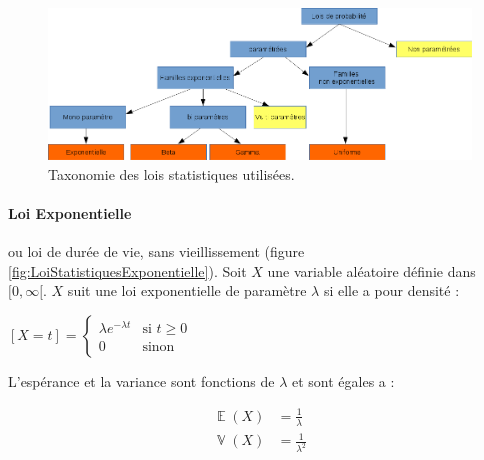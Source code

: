 \documentclass[a4paper,12pt]{report}
\DeclareMathOperator{\E}{\mathbb{E}} %
\DeclareMathOperator{\V}{\mathbb{V}} %
\theoremstyle{plain}				%
\theoremstyle{definition}				%
\begin{document}
\begin{figure}
{\centering
\includegraphics[width=\columnwidth]{taxonomieLoisStatistiques.png}
\caption{Taxonomie des lois statistiques utilisées.}
\label{fig:taxonomieLoisStatistiques}
\par}
\end{figure}

\paragraph{Loi Exponentielle} 
ou loi de durée de vie, sans vieillissement (figure \ref{fig:LoiStatistiquesExponentielle}).
Soit $X$ une variable aléatoire définie dans $[0, \infty[$. $X$ suit une loi exponentielle de paramètre $\lambda$ si elle a pour densité :


  \begin{center}
  $[X=t] = \left\{
    \begin{array}{ll}
        \lambda e^{-\lambda t}  & \mbox{si } t \geq 0  \\
        0 & \mbox{sinon}
    \end{array}
	\right.$
  \label{definitionLoiExponentielleDensite}
  \end{center}

L’espérance et la variance sont fonctions de $\lambda$ et sont égales a :

\begin{align*}
	\E(X) &= \frac{1}{\lambda} \\
	\V(X) &= \frac{1}{\lambda ^2}
\end{align*} 
\end{document}
